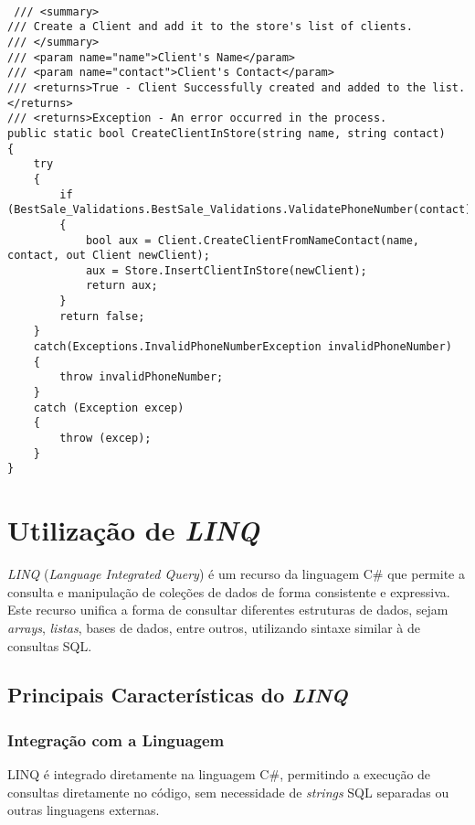 \documentclass[11pt]{scrartcl} %
\begin{document}
\begin{lstlisting}[language={[Sharp]C}, caption={Exemplo de Utilização destes padrões}, label={Utilização Padrões Microsoft .NET Coding Conventions}]
	
 /// <summary>
/// Create a Client and add it to the store's list of clients.
/// </summary>
/// <param name="name">Client's Name</param>
/// <param name="contact">Client's Contact</param>
/// <returns>True - Client Successfully created and added to the list.</returns>
/// <returns>Exception - An error occurred in the process.
public static bool CreateClientInStore(string name, string contact)
{
	try
	{
		if (BestSale_Validations.BestSale_Validations.ValidatePhoneNumber(contact))
		{
			bool aux = Client.CreateClientFromNameContact(name, contact, out Client newClient);
			aux = Store.InsertClientInStore(newClient);
			return aux;
		}
		return false;
	}
	catch(Exceptions.InvalidPhoneNumberException invalidPhoneNumber)
	{
		throw invalidPhoneNumber;
	}
	catch (Exception excep)
	{
		throw (excep);
	}
}
\end{lstlisting}

\newpage


\section{Utilização de \textit{LINQ}}
\textit{LINQ} (\textit{Language Integrated Query}) é um recurso da linguagem C\# que permite a consulta e manipulação de coleções de dados de forma consistente e expressiva. Este recurso unifica a forma de consultar diferentes estruturas de dados, sejam \textit{arrays}, \textit{listas}, bases de dados, entre outros, utilizando sintaxe similar à de consultas SQL.

\subsection{Principais Características do \textit{LINQ}}

\subsubsection{Integração com a Linguagem}

LINQ é integrado diretamente na linguagem C\#, permitindo a execução de consultas diretamente no código, sem necessidade de \textit{strings} SQL separadas ou outras linguagens externas.
\end{document}
